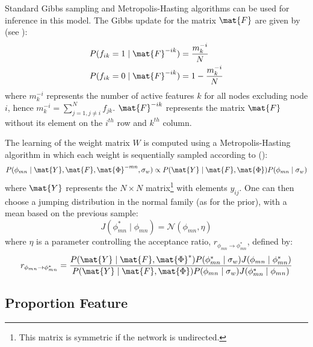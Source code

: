 Standard Gibbs sampling and Metropolis-Hasting algorithms can be used for inference in this model. The Gibbs update for the matrix $\mat{F}$ are given by (see \cite{IBP}):
%
\begin{align}
& P(f_{ik} = 1 \mid \mat{F}^{-ik}) = \frac{m_k^{-i}}{N} \nonumber \\
& P(f_{ik} = 0 \mid \mat{F}^{-ik}) = 1 - \frac{m_k^{-i}}{N} \nonumber
\end{align}
%
where $m_k^{-i}$ represents the number of active features $k$ for all nodes excluding node $i$, hence $m_k^{-i} = \sum_{j=1, j\neq i}^N f_{jk}$. $\mat{F}^{-ik}$ represents the matrix $\mat{F}$ without its element on the $i^{th}$ row and $k^{th}$ column.

The learning of the weight matrix $W$ is computed using a Metropolis-Hasting algorithm in which each weight is sequentially sampled according to (\cite{IBP}): 
%
\begin{equation}
P(\phi_{mn} \mid \mat{Y}, \mat{F}, \mat{\Phi}^{-mn}, \sigma_w) \propto P(\mat{Y} \mid \mat{F}, \mat{\Phi}) P(\phi_{mn} \mid \sigma_w) \nonumber
\end{equation}
%
where $\mat{Y}$ represents the $N \times N$ matrix\footnote{This matrix is symmetric if the network is undirected.} with elements $y_{ij}$. One can then choose a jumping distribution in the normal family (as for the prior), with a mean based on the previous sample:
%
\begin{equation} \label{eq:j_w}
J(\phi_{mn}^* \mid \phi_{mn}) = \mathcal{N}(\phi_{mn}, \eta) \nonumber
\end{equation}
%
where $\eta$ is a parameter controlling the acceptance ratio, $r_{\phi_{mn}\rightarrow \phi_{mn}^*}$, defined by:
%
\begin{equation} \label{eq:r_w}
r_{\phi_{mn}\rightarrow \phi_{mn}^*} = \frac{ P(\mat{Y} \mid \mat{F}, \mat{\Phi}^*)P(\phi_{mn}^* \mid \sigma_w)J(\phi_{mn} \mid \phi_{mn}^*) }{ P(\mat{Y} \mid \mat{F}, \mat{\Phi})P(\phi_{mn} \mid \sigma_w)J(\phi_{mn}^* \mid \phi_{mn} )} \nonumber
\end{equation}

\subsection{Proportion Feature}

